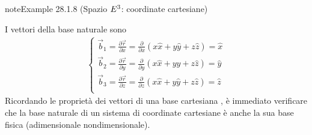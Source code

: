 \documentclass[letterpaper,10pt,italian]{jupyterBook}
\begin{document}
\begin{sphinxadmonition}{note}{Example 28.1.8 (Spazio \protect\(E^3\protect\): coordinate cartesiane)}



\sphinxAtStartPar
I vettori della base naturale sono
\begin{equation*}
\begin{split}\begin{cases}
  \vec{b}_1 = \frac{\partial \vec{r}}{\partial x} = \frac{\partial }{\partial x} \left( x \hat{x} + y \hat{y} + z \hat{z} \right) = \hat{x} \\
  \vec{b}_2 = \frac{\partial \vec{r}}{\partial y} = \frac{\partial }{\partial y} \left( x \hat{x} + y \hat{y} + z \hat{z} \right) = \hat{y} \\
  \vec{b}_3 = \frac{\partial \vec{r}}{\partial z} = \frac{\partial }{\partial z} \left( x \hat{x} + y \hat{y} + z \hat{z} \right) = \hat{z} \\
\end{cases}\end{split}
\end{equation*}
\sphinxAtStartPar
Ricordando le proprietà dei vettori di una base cartesiana  , è immediato verificare che la base naturale di un sistema di coordinate cartesiane è anche la sua base fisica (adimensionale non\sphinxhyphen{}dimensionale).
\end{sphinxadmonition}
\label{ch/vector-calculus/geometry:example-11}
\end{document}
